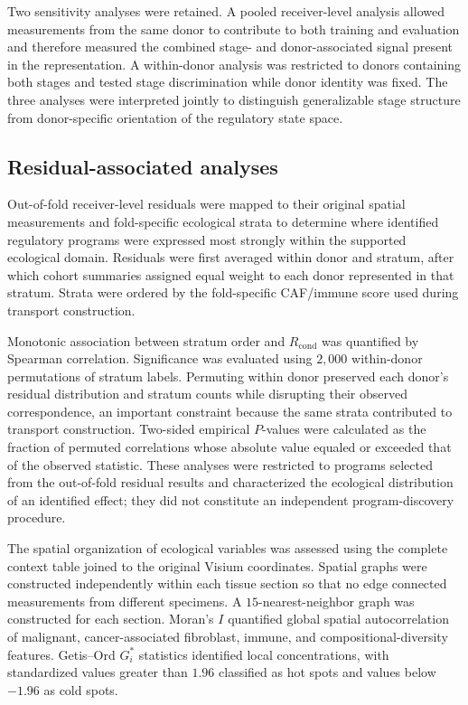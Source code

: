 Two sensitivity analyses were retained. A pooled receiver-level analysis
allowed measurements from the same donor to contribute to both training and
evaluation and therefore measured the combined stage- and donor-associated
signal present in the representation. A within-donor analysis was restricted
to donors containing both stages and tested stage discrimination while donor
identity was fixed. The three analyses were interpreted jointly to distinguish
generalizable stage structure from donor-specific orientation of the
regulatory state space.

\subsection{Residual-associated analyses}
\label{sec:methods-residual-localization}
\label{sec:methods-spatial-organization}
\label{sec:methods-projected-dynamics}

Out-of-fold receiver-level residuals were mapped to their original spatial
measurements and fold-specific ecological strata to determine where identified
regulatory programs were expressed most strongly within the supported
ecological domain. Residuals were first averaged within donor and stratum, after
which cohort summaries assigned equal weight to each donor represented in that
stratum. Strata were ordered by the fold-specific CAF/immune score used during
transport construction.

Monotonic association between stratum order and
\(R_{\mathrm{cond}}\) was quantified by Spearman correlation. Significance was
evaluated using \(2{,}000\) within-donor permutations of stratum labels.
Permuting within donor preserved each donor's residual distribution and stratum
counts while disrupting their observed correspondence, an important constraint
because the same strata contributed to transport construction. Two-sided
empirical \(P\)-values were calculated as the fraction of permuted correlations
whose absolute value equaled or exceeded that of the observed statistic. These
analyses were restricted to programs selected from the out-of-fold residual
results and characterized the ecological distribution of an identified effect;
they did not constitute an independent program-discovery procedure.

The spatial organization of ecological variables was assessed using the
complete context table joined to the original Visium coordinates. Spatial
graphs were constructed independently within each tissue section so that no
edge connected measurements from different specimens. A
\(15\)-nearest-neighbor graph was constructed for each section. Moran's \(I\)
\autocite{Moran1950-nc} quantified global spatial autocorrelation of
malignant, cancer-associated fibroblast, immune, and compositional-diversity
features. Getis--Ord \(G_i^\ast\) statistics
\autocite{Ord1995-pl} identified local concentrations, with
standardized values greater than \(1.96\) classified as hot spots and values
below \(-1.96\) as cold spots.

